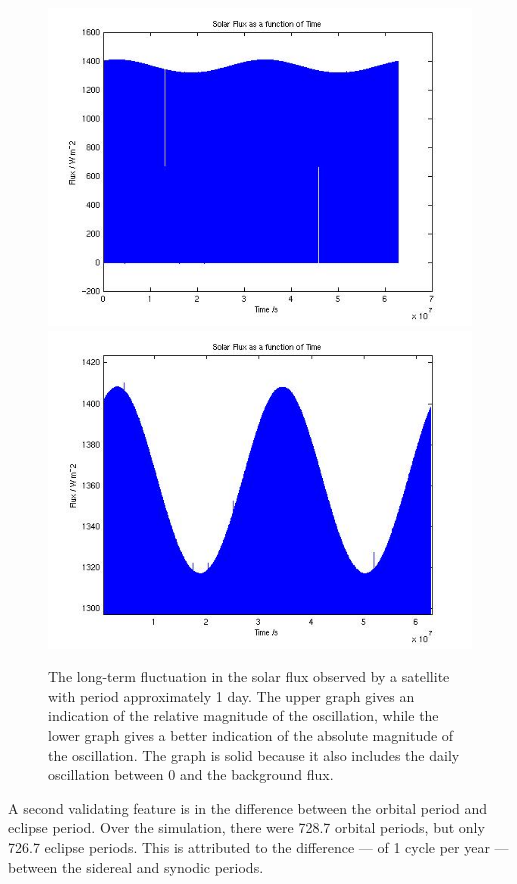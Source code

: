 \begin{description}
     \begin{figure}[!ht]
     \begin{center}
     \includegraphics[width=120mm]{figs/orbital/solarflux.jpg}
     \includegraphics[width=120mm]{figs/orbital/solarflux1.jpg}
     \caption{The long-term fluctuation in the solar flux observed by a
      satellite with period approximately 1 day.  The upper graph gives an indication of the relative magnitude of the oscillation, while the lower graph gives a better indication of the absolute magnitude of the oscillation.  The graph is solid because it also includes the daily oscillation between 0 and the background flux.}
     \label{fig:ivv_longorbit_flux}
     \end{center}
     \end{figure}

     A second validating feature is in the difference between the
     orbital period and eclipse period.  Over the simulation, there
     were 728.7 orbital periods, but only 726.7 eclipse periods.  This
     is attributed to the difference --- of 1 cycle per year ---
     between the sidereal and synodic periods.

  \end{description}



